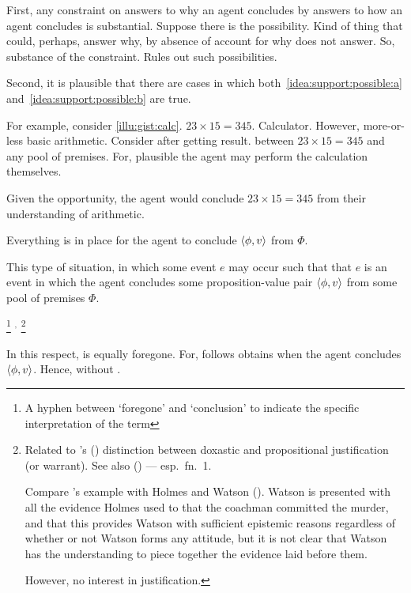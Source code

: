 \begin{note}
  First, any constraint on answers to why an agent concludes by answers to how an agent concludes is substantial.
  Suppose there is the possibility.
  Kind of thing that could, perhaps, answer why, by absence of  account for why does not answer.
  So, substance of the constraint.
  Rules out such possibilities.
\end{note}

\begin{note}
  Second, it is plausible that there are cases in which both~\ref{idea:support:possible:a} and~\ref{idea:support:possible:b} are true.

  For example, consider \autoref{illu:gist:calc}.
  \(23 \times 15 = 345\).
  Calculator.
  However, more-or-less basic arithmetic.
  Consider after getting result.
  \ros{} between \(23 \times 15 = 345\) and any pool of premises.
  For, plausible the agent may perform the calculation themselves.

  Given the opportunity, the agent would conclude \(23 \times 15 = 345\) from their understanding of arithmetic.

  Everything is in place for the agent to conclude \(\langle \phi, v \rangle\) from \(\Phi\).

  This type of situation, in which some event \(e\) may occur such that that \(e\) is an event in which the agent concludes some proposition-value pair \(\langle \phi, v \rangle\) from some pool of premises \(\Phi\).

  \fc{}%
  \footnote{
    A hyphen between `foregone' and `conclusion' to indicate the specific interpretation of the term
  }
  \(^{,}\)
  \footnote{
    Related to \citeauthor{Firth:1978vi}'s (\citeyear{Firth:1978vi}) distinction between doxastic and propositional justification (or warrant).
    See also \citeauthor{Silva:2020aa} (\citeyear{Silva:2020aa}) --- esp.\ fn.\ 1.

    {\color{red}
      Compare \citeauthor{Firth:1978vi}'s example with Holmes and Watson (\citeyear[218]{Firth:1978vi}).
      Watson is presented with all the evidence Holmes used to that the coachman committed the murder, and that this provides Watson with sufficient epistemic reasons regardless of whether or not Watson forms any attitude, but it is not clear that Watson has the understanding to piece together the evidence laid before them.
    }

    However, no interest in justification.
  }

  In this respect, \ros{} is equally foregone.
  For, \ros{} follows obtains when the agent concludes \(\langle \phi, v \rangle\).
  Hence, \ros{} without .
\end{note}

